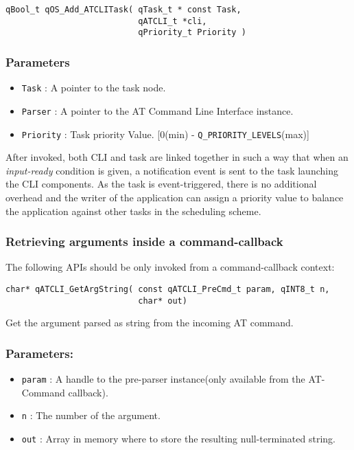 \begin{lstlisting}[style=CStyle]
qBool_t qOS_Add_ATCLITask( qTask_t * const Task, 
                           qATCLI_t *cli, 
                           qPriority_t Priority )
\end{lstlisting}

\subsubsection*{Parameters}
\begin{itemize}
    \item \lstinline{Task} : A pointer to the task node. 
    \item \lstinline{Parser} :  A pointer to the AT Command Line Interface instance.
    \item \lstinline{Priority} : Task priority Value. [0(min) - \lstinline{Q_PRIORITY_LEVELS}(max)]
\end{itemize}

After invoked, both CLI and task are linked together in such a way that when an \textit{input-ready} condition is given, a notification event is sent to the task launching the CLI components. As the task is event-triggered, there is no additional overhead and the writer of the application can assign a priority value to balance the application against other tasks in the scheduling scheme.

\subsubsection{Retrieving arguments inside a command-callback}

The following APIs should be only invoked from a command-callback context: \\

\begin{lstlisting}[style=CStyle]
char* qATCLI_GetArgString( const qATCLI_PreCmd_t param, qINT8_t n,
                           char* out)
\end{lstlisting}

Get the argument parsed as string from the incoming AT command. 

\subsubsection*{Parameters:}
\begin{itemize}
    \item \lstinline{param} : A handle to the pre-parser instance(only available from the AT-Command callback).
    \item \lstinline{n} : The number of the argument.
    \item \lstinline{out} :  Array in memory where to store the resulting null-terminated string.
\end{itemize}

